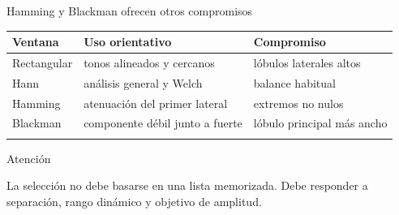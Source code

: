 \documentclass[
  10pt,
  ignorenonframetext,
  aspectratio=169,
  spanish,
]{beamer}
\begin{document}
\begin{frame}{Hamming y Blackman ofrecen otros compromisos}
\label{d2-046}
\begin{longtable}[]{@{}
  >{\raggedright\arraybackslash}p{}
  >{\raggedright\arraybackslash}p{}
  >{\raggedright\arraybackslash}p{}@{}}
\toprule\noalign{}
\begin{minipage}[b]{\linewidth}\raggedright
Ventana
\end{minipage} & \begin{minipage}[b]{\linewidth}\raggedright
Uso orientativo
\end{minipage} & \begin{minipage}[b]{\linewidth}\raggedright
Compromiso
\end{minipage} \\
\midrule\noalign{}
\endhead
Rectangular & tonos alineados y cercanos & lóbulos laterales altos \\
Hann & análisis general y Welch & balance habitual \\
Hamming & atenuación del primer lateral & extremos no nulos \\
Blackman & componente débil junto a fuerte & lóbulo principal más
ancho \\
\bottomrule\noalign{}
\end{longtable}

\begin{alertblock}{Atención}

La selección no debe basarse en una lista memorizada. Debe responder a
separación, rango dinámico y objetivo de amplitud.

\end{alertblock}

\end{frame}
\end{document}
